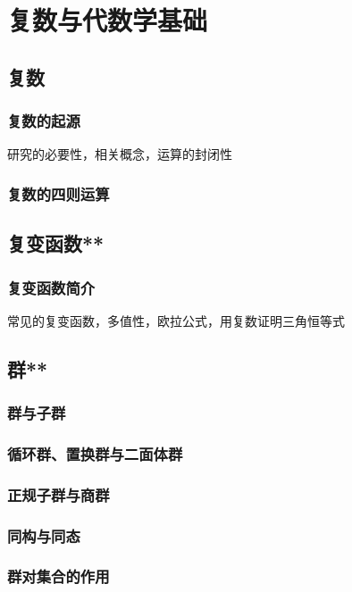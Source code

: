 \clearpage



\chapter{复数与代数学基础}

\section{复数}
\subsection{复数的起源}
研究的必要性，相关概念，运算的封闭性
\clearpage
\subsection{复数的四则运算}
\clearpage

\section{复变函数**}
\subsection{复变函数简介}
常见的复变函数，多值性，欧拉公式，用复数证明三角恒等式
\clearpage

\section{群**}
\subsection{群与子群}
\clearpage
\subsection{循环群、置换群与二面体群}
\clearpage
\subsection{正规子群与商群}
\clearpage
\subsection{同构与同态}
\clearpage
\subsection{群对集合的作用}
\clearpage
